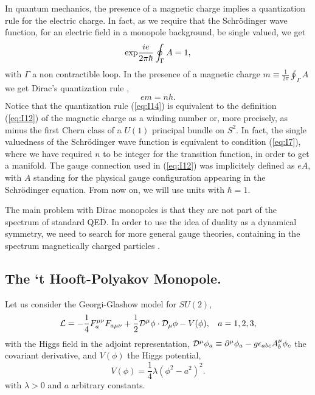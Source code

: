 In quantum mechanics, the presence of a magnetic charge implies a
quantization rule for the electric charge. In fact, as we require
that the Schr\"odinger wave function, for an electric field in a
monopole background, be single valued, we get 
\begin{equation}
\hbox {exp} \frac {ie}{2 \pi {\hbar}} \oint_{\Gamma} A = 1,
\label{eq:I13}
\end{equation}
with $\Gamma$ a non contractible loop. In the presence of a
magnetic charge $m \equiv \frac {1}{2\pi} \oint_{\Gamma} A $ we
get Dirac's quantization rule \cite{D1931},
\begin{equation}
em = n h.
\label{eq:I14}
\end{equation}
Notice that the quantization rule (\ref{eq:I14}) is equivalent to
the definition (\ref{eq:I12}) of the magnetic charge as a winding
number or, more precisely, as minus the first Chern class 
of a $U(1)$ principal bundle on $S^2$. In fact, the single valuedness of the Schr\"odinger wave
function is equivalent to condition (\ref{eq:I7}), where we have
required $n$ to be integer for the transition function, in order
to get a manifold. The gauge connection used in (\ref{eq:I12})
was implicitely defined as $eA$, with $A$ standing for the
physical gauge configuration appearing in the Schr\"odinger
equation. From now on, we will use units with $\hbar=1$.
  
The main problem with Dirac monopoles is that they are not part
of the spectrum of standard QED. In order to use the idea of
duality as a dynamical symmetry, we need to search for more general
gauge theories, containing in the spectrum magnetically charged
particles \cite{GO,GNO,MO}.

\subsection{The `t Hooft-Polyakov Monopole.}

Let us consider the Georgi-Glashow model \cite{GG} for $SU(2)$,
\begin{equation}
{\cal L}= - \frac {1}{4}F_{a}^{\mu \nu} F_{a \mu \nu} +
\frac {1}{2} {\cal D}^{\mu} \phi \cdot {\cal D}_{\mu} \phi - V(\phi),
\: \: \: \: a=1,2,3,
\label{eq:I15}
\end{equation}
with the Higgs field in the adjoint representation, 
${\cal D}^{\mu}\phi_{a} \equiv \partial ^{\mu} \phi_a - g \epsilon_{abc}
A_b ^{\mu} \phi_c $ the covariant derivative, and $V(\phi)$ the
Higgs potential,
\begin{equation}
V(\phi)= \frac {1}{4} \lambda (\phi^{2}-a^{2})^{2}.
\label{eq:I16}
\end{equation}
with $\lambda >0$ and $a$ arbitrary constants. 
  
